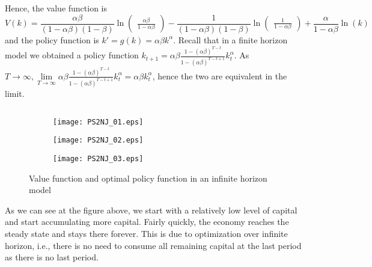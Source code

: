 \documentclass[]{article}
\begin{document}
Hence, the value function is
\begin{equation}
	V(k) = \frac{\alpha\beta}{(1 - \alpha\beta)(1 - \beta)}\ln\begin{pmatrix}\frac{\alpha\beta}{1 - \alpha\beta}\end{pmatrix} - \frac{1}{(1 - \alpha\beta)(1 - \beta)}\ln\begin{pmatrix}\frac{1}{1 - \alpha\beta}\end{pmatrix} + \frac{\alpha}{1 - \alpha\beta}\ln(k) \nonumber
\end{equation}
and the policy function is $k' = g(k) = \alpha\beta k^\alpha$. Recall that in a finite horizon model we obtained a policy function $k_{t+1} = \alpha\beta\frac{1 - (\alpha\beta)^{T-t}}{1 - (\alpha\beta)^{T-t+1}}k_t^\alpha$. As $T\longrightarrow\infty, \lim\limits_{T\to\infty}\alpha\beta\frac{1 - (\alpha\beta)^{T-t}}{1 - (\alpha\beta)^{T-t+1}}k_t^\alpha = \alpha\beta k_t^\alpha$, hence the two are equivalent in the limit.

\subsection{}\label{1.3}
\begin{figure}[h]
	\centering
	\begin{subfigure}{0.5\textwidth}
		\centering
		\texttt{[image: PS2NJ\_01.eps]}
		\caption{}
	\end{subfigure}%
	\begin{subfigure}{0.5\textwidth}
	\centering
	\texttt{[image: PS2NJ\_02.eps]}
	\caption{}
	\end{subfigure}
	\begin{subfigure}{\textwidth}
	\centering
	\texttt{[image: PS2NJ\_03.eps]}
	\caption{}
	\end{subfigure}
	\caption{Value function and optimal policy function in an infinite horizon model}
\end{figure}

As we can see at the figure above, we start with a relatively low level of capital and start accumulating more capital. Fairly quickly, the economy reaches the steady state and stays there forever. This is due to optimization over infinite horizon, i.e., there is no need to consume all remaining capital at the last period as there is no last period.

\section{}\label{2}
\end{document}
